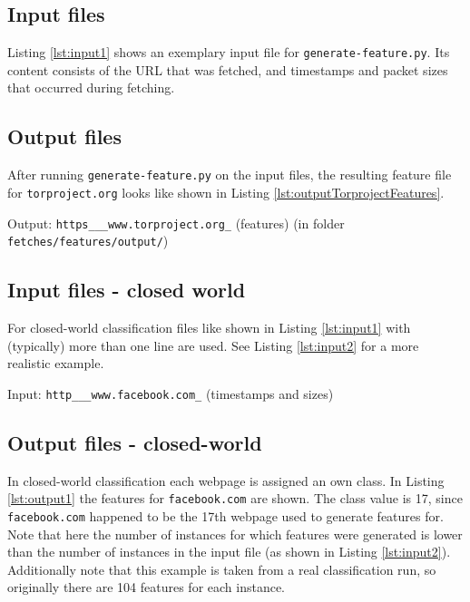\subsection{Input files}
Listing \ref{lst:input1} shows an exemplary input file for \texttt{generate-feature.py}. Its content consists of the URL that was fetched, and timestamps and packet sizes that occurred during fetching.

\subsection{Output files}
After running \texttt{generate-feature.py} on the input files, the resulting feature file for \texttt{torproject.org} looks like shown in Listing \ref{lst:outputTorprojectFeatures}.
\begin{listing}[h!]
\caption{Output: \texttt{https\_\_\_www.torproject.org\_} (features) (in folder \texttt{fetches/features/output/})}

\label{lst:outputTorprojectFeatures}
\end{listing}

\subsection{Input files - closed world}\label{sec:Input files - closed-world}
For closed-world classification files like shown in Listing \ref{lst:input1} with (typically) more than one line are used. See Listing \ref{lst:input2} for a more realistic example.

\begin{listing}[h!]
\caption{Input: \texttt{http\_\_\_www.facebook.com\_} (timestamps and sizes)}

\label{lst:input2}
\end{listing}

\subsection{Output files - closed-world}
In closed-world classification each webpage is assigned an own class. In Listing \ref{lst:output1} the features for \texttt{facebook.com} are shown. The class value is 17, since \texttt{facebook.com} happened to be the 17th webpage used to generate features for. Note that here the number of instances for which features were generated is lower than the number of instances in the input file (as shown in Listing \ref{lst:input2}). Additionally note that this example is taken from a real classification run, so originally there are 104 features for each instance.

